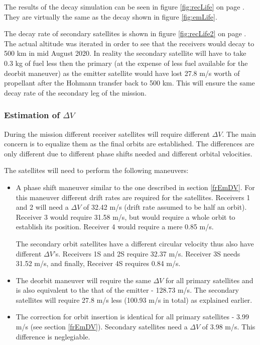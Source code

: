 The results of the decay simulation can be seen in figure \ref{fig:recLife} on page \pageref{fig:recLife}. They are virtually the same as the decay shown in figure \ref{fig:emLife}.

The decay rate of secondary satellites is shown in figure \ref{fig:recLife2} on page \pageref{fig:recLife2}. The actual altitude was iterated in order to see that the receivers would decay to 500 km in mid August 2020. In reality the secondary satellite will have to take 0.3 kg of fuel less then the primary (at the expense of less fuel available for the deorbit maneuver) as the emitter satellite would have lost 27.8 m/s worth of propellant after the Hohmann transfer back to 500 km. This will ensure the same decay rate of the secondary leg of the mission.    


\subsubsection{Estimation of $\Delta V$}
\label{frRecDV}

During the mission different receiver satellites will require different $\Delta V$. The main concern is to equalize them as the final orbits are established. The differences are only different due to different phase shifts needed and different orbital velocities.

The satellites will need to perform the following maneuvers:

\begin{itemize}
	\item A phase shift maneuver similar to the one described in section \ref{frEmDV}. For this maneuver different drift rates are required for the satellites. Receivers 1 and 2 will need a $\Delta V$ of 32.42 m/s (drift rate assumed to be half an orbit). Receiver 3 would require 31.58 m/s, but would require a whole orbit to establish its position. Receiver 4 would require a mere 0.85 m/s.
	
	The secondary orbit satellites have a different circular velocity thus also have different $\Delta V$'s. Receivers 1S and 2S require 32.37 m/s. Receiver 3S needs 31.52 m/s, and finally, Receiver 4S requires 0.84 m/s.
	\item The deorbit maneuver will require the same $\Delta V$ for all primary satellites and is also equivalent to the that of the emitter - 128.73 m/s. The secondary satellites will require 27.8 m/s less (100.93 m/s in total) as explained earlier.
	\item The correction for orbit insertion is identical for all primary satellites - 3.99 m/s (see section \ref{frEmDV}). Secondary satellites need a $\Delta V$ of 3.98 m/s. This difference is neglegiable.  
\end{itemize}

